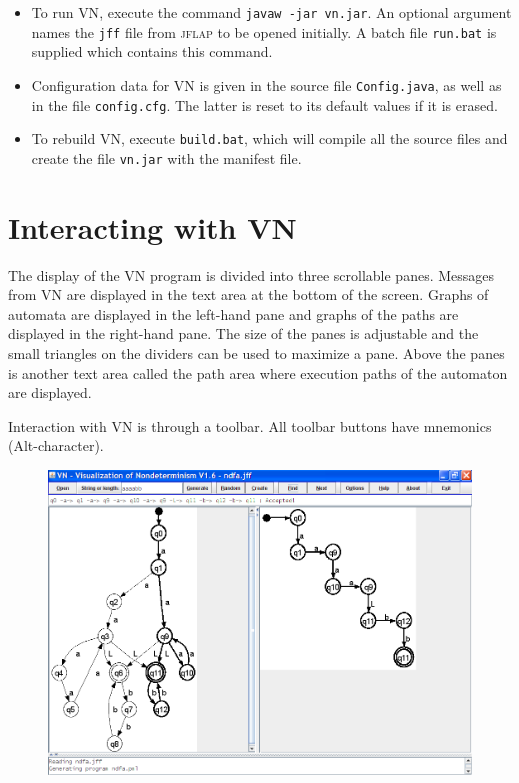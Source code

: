 \documentclass[11pt]{article}
\newcommand{\vn}{\textsc{VN}}
\newcommand{\jf}{\textsc{jflap}}
\newcommand{\p}[1]{\texttt{#1}}
\begin{document}
\begin{itemize}
\item To run \vn{}, execute the command \p{javaw -jar vn.jar}.
An optional argument names the \p{jff} file from \jf{} to be opened initially.
A batch file \p{run.bat} is supplied which contains this command.

\item Configuration data for \vn{} is given in the source file \p{Config.java}, 
as well as in the file \p{config.cfg}. The latter is reset to its default values
if it is erased.

\item To rebuild \vn{}, execute \p{build.bat}, which will compile all the source
files and create the file \p{vn.jar} with the manifest file.
\end{itemize}

\newpage

\section{Interacting with \vn{}}

The display of the \vn{} program is divided into three scrollable panes. 
Messages from \vn{} are displayed in the text area at the bottom of the screen.
Graphs of automata are displayed in the left-hand pane and graphs of the paths 
are displayed in the right-hand pane. The size of the panes is adjustable and 
the small triangles on the dividers can be used to maximize a pane.
Above the panes is another text area called the path area
where execution paths of the automaton are displayed.

Interaction with VN is through a toolbar. All toolbar buttons have mnemonics 
(Alt-character).

\begin{figure}
\begin{center}
\includegraphics[width=.9\textwidth,keepaspectratio=true]{vn.png}
\end{center}
\end{figure}
 
\end{document}
